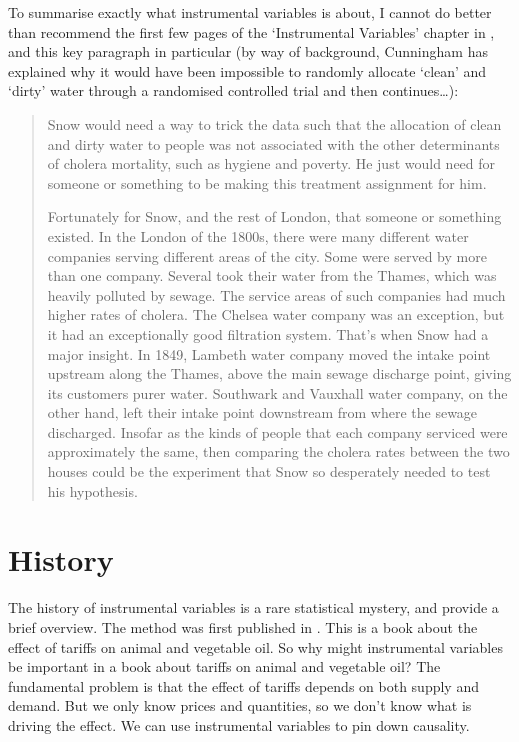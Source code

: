 \documentclass[
]{book}
\begin{document}
To summarise exactly what instrumental variables is about, I cannot do better than recommend the first few pages of the `Instrumental Variables' chapter in \citet{cunninghamnorap}, and this key paragraph in particular (by way of background, Cunningham has explained why it would have been impossible to randomly allocate `clean' and `dirty' water through a randomised controlled trial and then continues\ldots):

\begin{quote}
Snow would need a way to trick the data such that the allocation of clean and dirty water to people was not associated with the other determinants of cholera mortality, such as hygiene and poverty. He just would need for someone or something to be making this treatment assignment for him.

Fortunately for Snow, and the rest of London, that someone or something existed. In the London of the 1800s, there were many different water companies serving different areas of the city. Some were served by more than one company. Several took their water from the Thames, which was heavily polluted by sewage. The service areas of such companies had much higher rates of cholera. The Chelsea water company was an exception, but it had an exceptionally good filtration system. That's when Snow had a major insight. In 1849, Lambeth water company moved the intake point upstream along the Thames, above the main sewage discharge point, giving its customers purer water. Southwark and Vauxhall water company, on the other hand, left their intake point downstream from where the sewage discharged. Insofar as the kinds of people that each company serviced were approximately the same, then comparing the cholera rates between the two houses could be the experiment that Snow so desperately needed to test his hypothesis.
\end{quote}

\hypertarget{history}{%
\section{History}\label{history}}

The history of instrumental variables is a rare statistical mystery, and \citet{stock2003retrospectives} provide a brief overview. The method was first published in \citet{wright1928tariff}. This is a book about the effect of tariffs on animal and vegetable oil. So why might instrumental variables be important in a book about tariffs on animal and vegetable oil? The fundamental problem is that the effect of tariffs depends on both supply and demand. But we only know prices and quantities, so we don't know what is driving the effect. We can use instrumental variables to pin down causality.
\end{document}
